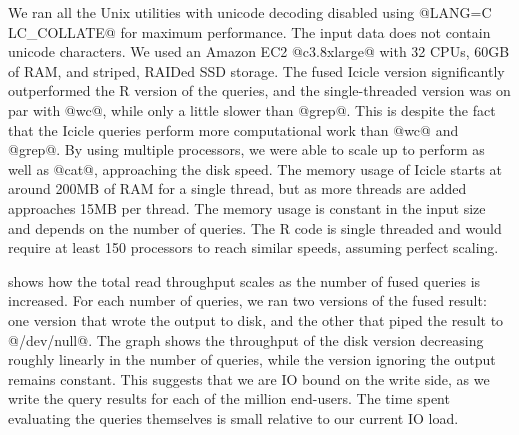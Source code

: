 We ran all the Unix utilities with unicode decoding disabled using @LANG=C LC_COLLATE@ for maximum performance. The input data does not contain unicode characters. 
We used an Amazon EC2 @c3.8xlarge@ with 32 CPUs, 60GB of RAM, and striped, RAIDed SSD storage. The fused Icicle version significantly outperformed the R version of the queries, and the single-threaded version was on par with @wc@, while only a little slower than @grep@. This is despite the fact that the Icicle queries perform more computational work than @wc@ and @grep@. By using multiple processors, we were able to scale up to perform as well as @cat@, approaching the disk speed.
The memory usage of Icicle starts at around 200MB of RAM for a single thread, but as more threads are added approaches 15MB per thread.
The memory usage is constant in the input size and depends on the number of queries.
The R code is single threaded and would require at least 150 processors to reach similar speeds, assuming perfect scaling.









 shows how the total read throughput scales as the number of fused queries is increased.
For each number of queries, we ran two versions of the fused result: one version that wrote the output to disk, and the other that piped the result to @/dev/null@.
The graph shows the throughput of the disk version decreasing roughly linearly in the number of queries, while the version ignoring the output remains constant.
This suggests that we are IO bound on the write side, as we write the query results for each of the million end-users.
The time spent evaluating the queries themselves is small relative to our current IO load.

